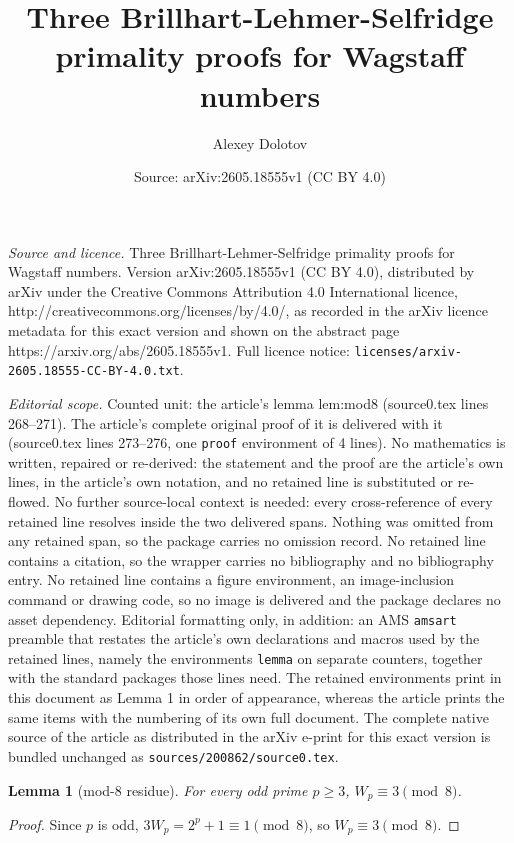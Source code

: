 \documentclass[10pt,a4paper]{amsart}
\title{Three Brillhart-Lehmer-Selfridge primality proofs for Wagstaff numbers}
\author{Alexey Dolotov}
\date{Source: arXiv:2605.18555v1 (CC BY 4.0)}
\newtheorem{lemma}{Lemma}
\begin{document}
\maketitle

\noindent\emph{Source and licence.} Three Brillhart-Lehmer-Selfridge primality proofs for Wagstaff numbers. Version arXiv:2605.18555v1 (CC BY 4.0), distributed by arXiv under the Creative Commons Attribution 4.0 International licence, http://creativecommons.org/licenses/by/4.0/, as recorded in the arXiv licence metadata for this exact version and shown on the abstract page https://arxiv.org/abs/2605.18555v1. Full licence notice: \texttt{licenses/arxiv-2605.18555-CC-BY-4.0.txt}.\par\smallskip

\noindent\textit{Editorial scope.} Counted unit: the article's lemma lem:mod8 (source0.tex lines 268--271). The article's complete original proof of it is delivered with it (source0.tex lines 273--276, one \texttt{proof} environment of 4 lines). No mathematics is written, repaired or re-derived: the statement and the proof are the article's own lines, in the article's own notation, and no retained line is substituted or re-flowed.  No further source-local context is needed: every cross-reference of every retained line resolves inside the two delivered spans.  Nothing was omitted from any retained span, so the package carries no omission record.  No retained line contains a citation, so the wrapper carries no bibliography and no bibliography entry.  No retained line contains a figure environment, an image-inclusion command or drawing code, so no image is delivered and the package declares no asset dependency.  Editorial formatting only, in addition: an AMS \texttt{amsart} preamble that restates the article's own declarations and macros used by the retained lines, namely the environments \texttt{lemma} on separate counters, together with the standard packages those lines need.  The retained environments print in this document as Lemma 1 in order of appearance, whereas the article prints the same items with the numbering of its own full document.  The complete native source of the article as distributed in the arXiv e-print for this exact version is bundled unchanged as \texttt{sources/200862/source0.tex}.
\begin{lemma}[mod-$8$ residue]
\label{lem:mod8}
For every odd prime $p \geq 3$, $W_p \equiv 3 \pmod{8}$.
\end{lemma}

\begin{proof}
Since $p$ is odd, $3 W_p = 2^p + 1 \equiv 1 \pmod 8$, so $W_p \equiv 3
\pmod 8$.
\end{proof}
\end{document}
